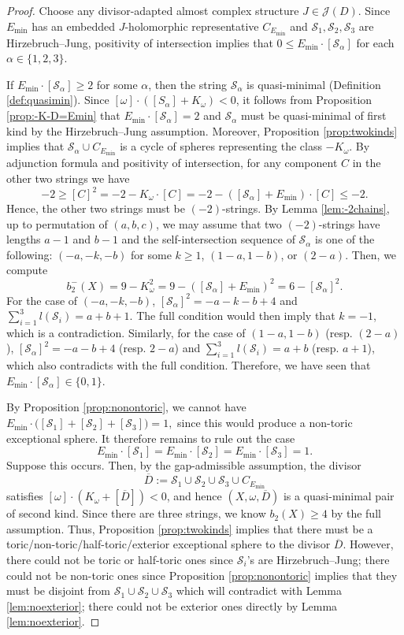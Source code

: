 \documentclass[11pt]{article}
\theoremstyle{definition}
\theoremstyle{remark}
\newcommand{\st}{\mathcal{S}}
\begin{document}
\begin{proof}
  Choose any divisor-adapted almost complex structure $J\in\mathcal{J}(D)$. Since $E_{\text{min}}$ has an embedded $J$-holomorphic representative $C_{E_{\text{min}}}$ and $\st_1,\st_2,\st_3$ are Hirzebruch--Jung, positivity of intersection implies that 
  \(
    0\le E_{\min}\cdot[\st_\alpha]
  \)
  for each $\alpha\in\{1,2,3\}$. 
  
  If $E_{\min}\cdot[\st_\alpha]\geq 2$ for some $\alpha$, then the string $\st_\alpha$ is quasi-minimal (Definition \ref{def:quasimin}). Since $[\omega]\cdot([S_\alpha]+K_\omega)<0$, it follows from Proposition \ref{prop:-K-D=Emin} that $E_{\min}\cdot[\st_\alpha]= 2$ and $\st_\alpha$ must be quasi-minimal of first kind by the Hirzebruch--Jung assumption. Moreover, Proposition \ref{prop:twokinds} implies that $\st_\alpha\cup C_{E_\text{min}}$ is a cycle of spheres representing the class $-K_\omega$. By adjunction formula and positivity of intersection, for any component $C$ in the other two strings we have 
  \[-2\geq [C]^2=-2-K_\omega\cdot[C]=-2-([\st_\alpha]+E_{\text{min}})\cdot [C]\leq -2.\]
  Hence, the other two strings must be $(-2)$-strings. By Lemma \ref{lem:-2chains}, up to permutation of $(a,b,c)$, we may assume that two $(-2)$-strings have lengths $a-1$ and $b-1$ and the self-intersection sequence of $\st_\alpha$ is one of the following: $(-a,-k,-b)$ for some $k\geq 1$, $(1-a,1-b)$, or $(2-a)$. Then, we compute
  \[b_2^-(X)=9-K_{\omega}^2=9-([\st_\alpha]+E_{\text{min}})^2=6-[\st_\alpha]^2.\]
  For the case of $(-a,-k,-b)$, $[\st_\alpha]^2=-a-k-b+4$ and $\sum_{i=1}^3l(\st_i)=a+b+1$. The full condition would then imply that $k=-1$, which is a contradiction. Similarly, for the case of $(1-a,1-b)$ (resp. $(2-a)$), $[\st_\alpha]^2=-a-b+4$ (resp. $2-a$) and $\sum_{i=1}^3l(\st_i)=a+b$ (resp. $a+1$), which also contradicts with the full condition. Therefore, we have seen that $E_{\min}\cdot[\st_\alpha]\in\{0,1\}$. 

  By Proposition \ref{prop:nonontoric}, we cannot have
  \(
    E_{\min}\cdot\bigl([\st_1]+[\st_2]+[\st_3]\bigr)=1,
  \)
  since this would produce a non-toric exceptional sphere. It therefore remains to rule out the case
  \[
    E_{\min}\cdot[\st_1]=E_{\min}\cdot[\st_2]=E_{\min}\cdot[\st_3]=1.
  \]
  Suppose this occurs. Then, by the gap-admissible assumption, the divisor
  \[
    \overline{D}:=\st_1\cup\st_2\cup\st_3\cup C_{E_\text{min}}
  \]
  satisfies $[\omega]\cdot(K_\omega+[\overline{D}])<0$, and hence $(X,\omega,\overline{D})$ is a quasi-minimal pair of second kind. Since there are three strings, we know $b_2(X)\geq 4$ by the full assumption. Thus,  Proposition \ref{prop:twokinds} implies that there must be a toric/non-toric/half-toric/exterior exceptional sphere to the divisor $\overline{D}$. However, there could not be toric or half-toric ones since $\st_i$'s are Hirzebruch--Jung; there could not be non-toric ones since Proposition \ref{prop:nonontoric} implies that they must be disjoint from $\st_1\cup\st_2\cup\st_3$ which will contradict with Lemma \ref{lem:noexterior}; there could not be exterior ones directly by Lemma \ref{lem:noexterior}.
\end{proof}
\end{document}
